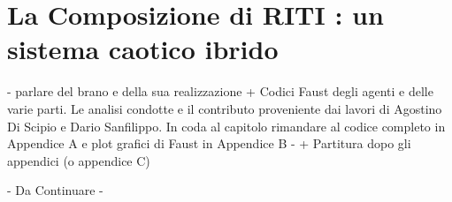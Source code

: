 \section{La Composizione di RITI : un sistema caotico ibrido}
\label{sec:La Composizione di RITI : un sistema caotico ibrido}

- parlare del brano e della sua realizzazione +
Codici Faust degli agenti e delle varie parti.
Le analisi condotte e il contributo proveniente dai lavori
di Agostino Di Scipio e Dario Sanfilippo.
In coda al capitolo rimandare al codice completo in Appendice A e plot
grafici di Faust in Appendice B -
+ Partitura dopo gli appendici (o appendice C)

\begin{center} \vspace{0.5cm} \Huge - Da Continuare - \normalsize \vspace{0.5cm} \end{center}